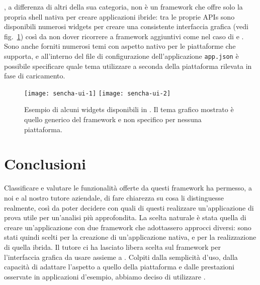             \senchat{}, a differenza di altri della sua categoria, non è un
            frame\-work che offre solo la propria shell nativa per creare
            applicazioni ibride: tra le proprie APIs sono disponibili numerosi
            widgets per creare una consistente interfaccia grafica
            (vedi fig.~\ref{fig:senchaui}) così da non dover ricorrere a
            frame\-work aggiuntivi come nel caso di \pg{} e \rhom{}. Sono anche
            forniti numerosi temi con aspetto nativo per le piattaforme che
            supporta, e all'interno del file di configurazione dell'applicazione
            \verb|app.json| è possibile specificare quale tema utilizzare a
            seconda della piattaforma rilevata in fase di caricamento.
            \begin{figure}[h]
                \centering
                \texttt{[image: sencha-ui-1]}
                \texttt{[image: sencha-ui-2]}
                \caption{
                    Esempio di alcuni widgets disponibili in \senchat{}.
                    Il tema grafico mostrato è quello generico del frame\-work e
                    non specifico per nessuna piattaforma.
                }
                \label{fig:senchaui}
            \end{figure}

    \section{Conclusioni}
        Classificare e valutare le funzionalità offerte da questi frame\-work
        ha permesso, a noi e al nostro tutore aziendale, di fare chiarezza su cosa
        li distinguesse realmente, così
        da poter decidere con quali di questi realizzare un'applicazione di prova utile
        per un'analisi più approfondita.
        La scelta naturale è stata quella di creare un'applicazione con due
        frame\-work che adottassero approcci diversi: sono stati quindi scelti
        \tisdk{} per la creazione di un'applicazione nativa, e
        \pg{} per la realizzazione di quella ibrida.
        Il tutore ci ha lasciato libera scelta sul frame\-work per l'interfaccia
        grafica da usare assieme a \pg{}. Colpiti dalla semplicità d'uso,
        dalla capacità di adattare l'aspetto a quello della piattaforma e
        dalle prestazioni osservate in applicazioni d'esempio, abbiamo deciso
        di utilizzare \kendomob{}.

